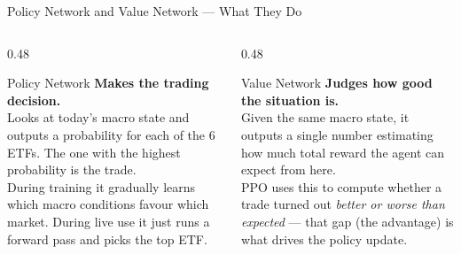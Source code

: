 \documentclass[aspectratio=169,11pt]{beamer}
\begin{document}
\begin{frame}{Policy Network and Value Network --- What They Do}
  \vspace{0.5em}
  \begin{columns}[T]
    \begin{column}{0.48\textwidth}
      \begin{block}{Policy Network}
        \vspace{0.4em}\normalsize
        \textbf{Makes the trading decision.}\\[0.5em]
        Looks at today's macro state and outputs a probability for each of the 6 ETFs. The one with the highest probability is the trade.\\[0.5em]
        During training it gradually learns which macro conditions favour which market. During live use it just runs a forward pass and picks the top ETF.
        \vspace{0.4em}
      \end{block}
    \end{column}
    \begin{column}{0.48\textwidth}
      \begin{block}{Value Network}
        \vspace{0.4em}\normalsize
        \textbf{Judges how good the situation is.}\\[0.5em]
        Given the same macro state, it outputs a single number estimating how much total reward the agent can expect from here.\\[0.5em]
        PPO uses this to compute whether a trade turned out \textit{better or worse than expected} --- that gap (the advantage) is what drives the policy update.
        \vspace{0.4em}
      \end{block}
    \end{column}
  \end{columns}
\end{frame}

\end{document}
